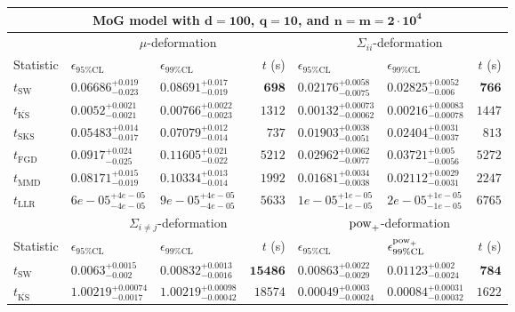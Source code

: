 \begin{tabular}{l|llr|llr}
	\toprule
	\multicolumn{7}{c}{{\bf MoG model with $\mathbf{d=100}$, $\mathbf{q=10}$, and $\mathbf{n=m=2\cdot 10^{4}}$}} \\
	\toprule
	\multicolumn{1}{c}{} & \multicolumn{3}{c}{$\mu$-deformation} & \multicolumn{3}{c}{$\Sigma_{ii}$-deformation} \\
	Statistic & $\epsilon_{95\%\mathrm{CL}}$ & $\epsilon_{99\%\mathrm    {CL}}$ & $t$ (s) & $\epsilon_{95\%\mathrm{CL}}$ & $\epsilon_{99\%\mathrm{CL}}$ & $t$ (s) \\
	\midrule
	$t_{\mathrm{SW}}$ & $0.06686_{-0.023}^{+0.019}$ & $0.08691_{-0.019}^{+0.017}$ & ${\mathbf{698}}$ & $0.02176_{-0.0075}^{+0.0058}$ & $0.02825_{-0.006}^{+0.0052}$ & ${\mathbf{766}}$ \\
	$t_{\overline{\mathrm{KS}}}$ & ${\mathbf{0.0052_{-0.0021}^{+0.0021}}}$ & ${\mathbf{0.00766_{-0.0023}^{+0.0022}}}$ & $1312$ & ${\mathbf{0.00132_{-0.00062}^{+0.00073}}}$ & ${\mathbf{0.00216_{-0.00078}^{+0.00083}}}$ & $1447$ \\
	$t_{\mathrm{SKS}}$ & $0.05483_{-0.017}^{+0.014}$ & $0.07079_{-0.014}^{+0.012}$ & $737$ & $0.01903_{-0.0051}^{+0.0038}$ & $0.02404_{-0.0037}^{+0.0031}$ & $813$ \\
	$t_{\mathrm{FGD}}$ & $0.0917_{-0.025}^{+0.024}$ & $0.11605_{-0.022}^{+0.021}$ & $5212$ & $0.02962_{-0.0077}^{+0.0062}$ & $0.03721_{-0.0056}^{+0.005}$ & $5272$ \\
	$t_{\mathrm{MMD}}$ & $0.08171_{-0.019}^{+0.015}$ & $0.10334_{-0.014}^{+0.013}$ & $1992$ & $0.01681_{-0.0038}^{+0.0034}$ & $0.02112_{-0.0031}^{+0.0029}$ & $2247$ \\
	$t_{\mathrm{LLR}}$ & $6e-05_{-4e-05}^{+4e-05}$ & $9e-05_{-4e-05}^{+4e-05}$ & $5633$ & $1e-05_{-1e-05}^{+1e-05}$ & $2e-05_{-1e-05}^{+1e-05}$ & $6765$ \\
	\toprule
	\multicolumn{1}{c}{} & \multicolumn{3}{c}{$\Sigma_{i\neq j}$-deformation} & \multicolumn{3}{c}{$\rm{pow}_{+}$-deformation} \\
	Statistic & $\epsilon_{95\%\mathrm{CL}}$ & $\epsilon_{99\%\mathrm{CL}}$ & $t$ (s) & $\epsilon_{95\%\mathrm{CL}}$ & $\epsilon^{\rm   {pow}_{+}}_{99\%\mathrm{CL}}$ & $t$ (s) \\
	\midrule
	$t_{\mathrm{SW}}$ & $0.0063_{-0.002}^{+0.0015}$ & $0.00832_{-0.0016}^{+0.0013}$ & ${\mathbf{15486}}$ & $0.00863_{-0.0029}^{+0.0022}$ & $0.01123_{-0.0024}^{+0.002}$ & ${\mathbf{784}}$ \\
	$t_{\overline{\mathrm{KS}}}$ & $1.00219_{-0.0017}^{+0.00074}$ & $1.00219_{-0.00042}^{+0.00098}$ & $18574$ & ${\mathbf{0.00049_{-0.00024}^{+0.0003}}}$ & ${\mathbf{0.00084_{-0.00032}^{+0.00031}}}$ & $1622$ \\

\end{tabular}
